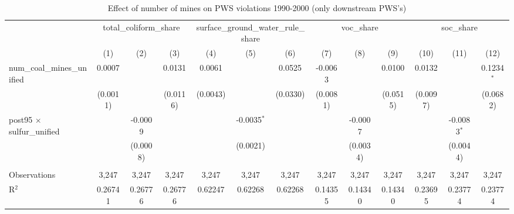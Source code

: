 
\begin{table}[htbp]
   \caption{\label{olsrf2sls_nummine_non_mine_vio_1990to2000dwnstrm_coalunified} Effect of number of mines on PWS violations 1990-2000 (only downstream PWS's)}
   \bigskip
   \centering
   \begin{adjustbox}{width = \textwidth, center}
      \begin{tabular}{lcccccccccccc}
         \toprule
          & \multicolumn{3}{c}{total\_coliform\_share} & \multicolumn{3}{c}{surface\_ground\_water\_rule\_share} & \multicolumn{3}{c}{voc\_share} & \multicolumn{3}{c}{soc\_share}\\
                                                          & (1)                   & (2)           & (3)           & (4)           & (5)           & (6)           & (7)           & (8)                   & (9)                   & (10)          & (11)          & (12)\\  
         \midrule 
         num\_coal\_mines\_unified                        & 0.0007                &               & 0.0131        & 0.0061        &               & 0.0525        & -0.0063       &                       & 0.0100                & 0.0132        &               & 0.1234$^{*}$\\   
                                                          & (0.0011)              &               & (0.0116)      & (0.0043)      &               & (0.0330)      & (0.0081)      &                       & (0.0515)              & (0.0097)      &               & (0.0682)\\   
         post95 $\times$ sulfur\_unified                  &                       & -0.0009       &               &               & -0.0035$^{*}$ &               &               & -0.0007               &                       &               & -0.0083$^{*}$ &   \\   
                                                          &                       & (0.0008)      &               &               & (0.0021)      &               &               & (0.0034)              &                       &               & (0.0044)      &   \\   
          \\
         Observations                                     & 3,247                 & 3,247         & 3,247         & 3,247         & 3,247         & 3,247         & 3,247         & 3,247                 & 3,247                 & 3,247         & 3,247         & 3,247\\  
         R$^2$                                            & 0.26741               & 0.26776       & 0.26776       & 0.62247       & 0.62268       & 0.62268       & 0.14355       & 0.14340               & 0.14340               & 0.23695       & 0.23774       & 0.23774\\  

\end{tabular}
\end{adjustbox}
\end{table}
